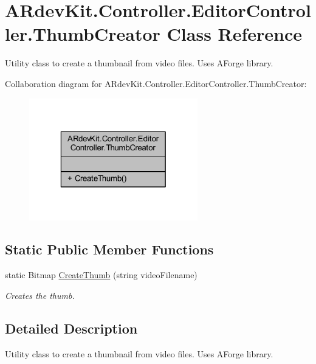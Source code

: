 \hypertarget{class_a_rdev_kit_1_1_controller_1_1_editor_controller_1_1_thumb_creator}{\section{A\-Rdev\-Kit.\-Controller.\-Editor\-Controller.\-Thumb\-Creator Class Reference}
\label{class_a_rdev_kit_1_1_controller_1_1_editor_controller_1_1_thumb_creator}
}


Utility class to create a thumbnail from video files. Uses A\-Forge library.  




Collaboration diagram for A\-Rdev\-Kit.\-Controller.\-Editor\-Controller.\-Thumb\-Creator\-:
\nopagebreak
\begin{figure}[H]
\begin{center}
\leavevmode
\includegraphics[width=208pt]{class_a_rdev_kit_1_1_controller_1_1_editor_controller_1_1_thumb_creator__coll__graph}
\end{center}
\end{figure}
\subsection*{Static Public Member Functions}
\begin{DoxyCompactItemize}
\item 
static Bitmap \hyperlink{class_a_rdev_kit_1_1_controller_1_1_editor_controller_1_1_thumb_creator_a0ee173143759d30a2f48cf4a24ff6e20}{Create\-Thumb} (string video\-Filename)
\begin{DoxyCompactList}\small\item\em Creates the thumb. \end{DoxyCompactList}\end{DoxyCompactItemize}


\subsection{Detailed Description}
Utility class to create a thumbnail from video files. Uses A\-Forge library. 



